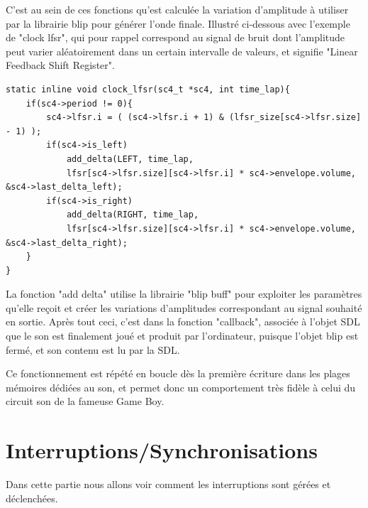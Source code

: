 \documentclass{report}
\begin{document}
C'est au sein de ces fonctions qu'est calculée la variation d'amplitude à utiliser par la librairie blip pour générer l'onde finale.
Illustré ci-dessous avec l'exemple de "clock lfsr", qui pour rappel correspond au signal de bruit dont l'amplitude peut varier aléatoirement dans 
un certain intervalle de valeurs, et signifie "Linear Feedback Shift Register".
\begin{lstlisting}
static inline void clock_lfsr(sc4_t *sc4, int time_lap){
	if(sc4->period != 0){
		sc4->lfsr.i = ( (sc4->lfsr.i + 1) & (lfsr_size[sc4->lfsr.size] - 1) );
		if(sc4->is_left)
			add_delta(LEFT, time_lap,
			lfsr[sc4->lfsr.size][sc4->lfsr.i] * sc4->envelope.volume, &sc4->last_delta_left);
		if(sc4->is_right)
			add_delta(RIGHT, time_lap,
			lfsr[sc4->lfsr.size][sc4->lfsr.i] * sc4->envelope.volume, &sc4->last_delta_right);
	}
}
\end{lstlisting}

La fonction "add delta" utilise la librairie "blip buff" pour exploiter les paramètres qu'elle reçoit et créer 
les variations d'amplitudes correspondant au signal souhaité en sortie.
Après tout ceci, c'est dans la fonction "callback", associée à l'objet SDL que le son est finalement joué et produit par l'ordinateur, puisque l'objet blip est fermé, et son contenu est lu par la SDL.

Ce fonctionnement est répété en boucle dès la première écriture dans les plages mémoires dédiées au son, et permet donc un comportement très fidèle à celui du circuit son de la fameuse Game Boy.
\section{Interruptions/Synchronisations}
Dans cette partie nous allons voir comment les interruptions sont gérées et déclenchées. 
\end{document}
